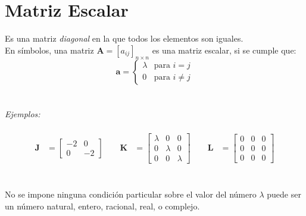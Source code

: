 \documentclass[a4paper,12pt]{report} %
\begin{document}
\section{Matriz Escalar}
Es una matriz \textit{diagonal} en la que todos los elementos son iguales.\\
En símbolos, una matriz \(\mathbf{A} = \left[\mathit{a_{ij}}\right]_\mathit{n\times n}\) es una matriz escalar, si se cumple que:
\vspace{0.5cm}
\[
\mathbf{a} = \begin{cases}
    \lambda & \text{para } \mathit{i = j} \\
    0 & \text{para } \mathit{i\neq j}
    \end{cases}
\]
\\ \\
\textit{Ejemplos:} \\ \\
\[
\begin{aligned}
\mathbf{J} &= \begin{bmatrix}
    -2 & 0 \\
    0 & -2
\end{bmatrix}
\qquad
\mathbf{K} &= \begin{bmatrix}
    \lambda  & 0 & 0 \\
    0 & \lambda & 0 \\
    0 & 0 & \lambda
\end{bmatrix}
\qquad
\mathbf{L} &= \begin{bmatrix}
    0 & 0 & 0 \\
    0 & 0 & 0 \\
    0 & 0 & 0
\end{bmatrix}
\end{aligned}
\]
\\ \\
No se impone ninguna condición particular sobre el valor del número \(\lambda\) puede ser un número natural, entero, racional, real, o complejo.
\end{document}
